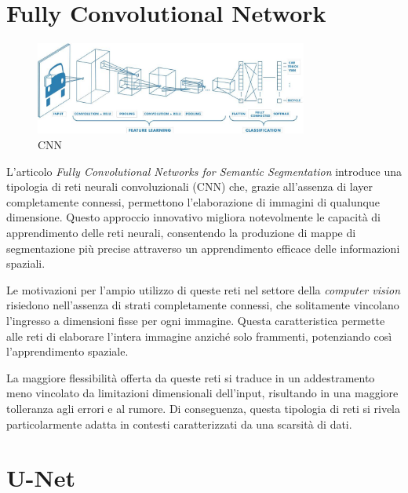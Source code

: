 \section{Fully Convolutional Network} 
\begin{figure}[!ht]
  \begin{center}
    \includegraphics[width=0.8\textwidth]{Immagini/cnn.png}
  \end{center}
  \caption{CNN}
  \label{fig:cnn}
\end{figure}



L'articolo \textit{Fully Convolutional Networks for Semantic Segmentation} \cite{long2015fully}
introduce una tipologia di reti neurali convoluzionali (CNN) che, grazie all'assenza di layer
completamente connessi, permettono l'elaborazione di immagini di qualunque dimensione. Questo
approccio innovativo migliora notevolmente le capacità di apprendimento delle reti neurali,
consentendo la produzione di mappe di segmentazione più precise attraverso un apprendimento efficace
delle informazioni spaziali.

Le motivazioni per l'ampio utilizzo di queste reti nel settore della \textit{computer vision}
risiedono nell'assenza di strati completamente connessi, che solitamente vincolano l'ingresso a
dimensioni fisse per ogni immagine. Questa caratteristica permette alle reti di elaborare l'intera
immagine anziché solo frammenti, potenziando così l'apprendimento spaziale.

La maggiore flessibilità offerta da queste reti si traduce in un addestramento meno vincolato da
limitazioni dimensionali dell'input, risultando in una maggiore tolleranza agli errori e al rumore.
Di conseguenza, questa tipologia di reti si rivela particolarmente adatta in contesti caratterizzati
da una scarsità di dati.


\section{U-Net} \label{sec:unet} 

